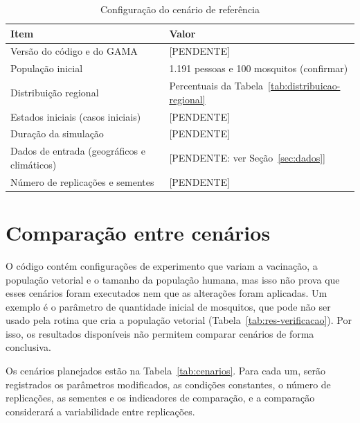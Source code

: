 \begin{table}[htb]
    \centering
    \caption{Configuração do cenário de referência}
    \label{tab:referencia}
    \begin{tabular}{l p{9.0cm}}
        \hline
        \textbf{Item} & \textbf{Valor} \\
        \hline
        Versão do código e do GAMA & [PENDENTE] \\
        População inicial & 1.191 pessoas e 100 mosquitos (confirmar) \\
        Distribuição regional & Percentuais da Tabela~\ref{tab:distribuicao-regional} \\
        Estados iniciais (casos iniciais) & [PENDENTE] \\
        Duração da simulação & [PENDENTE] \\
        Dados de entrada (geográficos e climáticos) & [PENDENTE: ver Seção~\ref{sec:dados}] \\
        Número de replicações e sementes & [PENDENTE] \\
        \hline
    \end{tabular}
\end{table}

\section{Comparação entre cenários}
\label{sec:res-cenarios}
O código contém configurações de experimento que variam a vacinação, a população vetorial e o tamanho da população humana, mas isso não prova que esses cenários foram executados nem que as alterações foram aplicadas. Um exemplo é o parâmetro de quantidade inicial de mosquitos, que pode não ser usado pela rotina que cria a população vetorial (Tabela~\ref{tab:res-verificacao}). Por isso, os resultados disponíveis não permitem comparar cenários de forma conclusiva.

Os cenários planejados estão na Tabela~\ref{tab:cenarios}. Para cada um, serão registrados os parâmetros modificados, as condições constantes, o número de replicações, as sementes e os indicadores de comparação, e a comparação considerará a variabilidade entre replicações.

